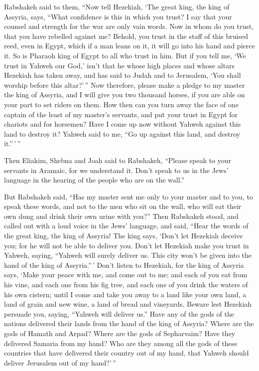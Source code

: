  Rabshakeh said to them, ``Now tell Hezekiah, `The great
king, the king of Assyria, says, ``What confidence is this in which you
trust?  I say that your counsel and strength for the war
are only vain words. Now in whom do you trust, that you have rebelled
against me?  Behold, you trust in the staff of this
bruised reed, even in Egypt, which if a man leans on it, it will go into
his hand and pierce it. So is Pharaoh king of Egypt to all who trust in
him.  But if you tell me, `We trust in Yahweh our God,'
isn't that he whose high places and whose altars Hezekiah has taken
away, and has said to Judah and to Jerusalem, `You shall worship before
this altar?'\,''  Now therefore, please make a pledge to
my master the king of Assyria, and I will give you two thousand horses,
if you are able on your part to set riders on them.  How
then can you turn away the face of one captain of the least of my
master's servants, and put your trust in Egypt for chariots and for
horsemen?  Have I come up now without Yahweh against this
land to destroy it? Yahweh said to me, ``Go up against this land, and
destroy it.''\,'\,''

 Then Eliakim, Shebna and Joah said to Rabshakeh,
``Please speak to your servants in Aramaic, for we understand it. Don't
speak to us in the Jews' language in the hearing of the people who are
on the wall.''

 But Rabshakeh said, ``Has my master sent me only to your
master and to you, to speak these words, and not to the men who sit on
the wall, who will eat their own dung and drink their own urine with
you?''  Then Rabshakeh stood, and called out with a loud
voice in the Jews' language, and said, ``Hear the words of the great
king, the king of Assyria!  The king says, `Don't let
Hezekiah deceive you; for he will not be able to deliver you.
 Don't let Hezekiah make you trust in Yahweh, saying,
``Yahweh will surely deliver us. This city won't be given into the hand
of the king of Assyria.''\,'  Don't listen to Hezekiah,
for the king of Assyria says, `Make your peace with me, and come out to
me; and each of you eat from his vine, and each one from his fig tree,
and each one of you drink the waters of his own cistern; 
until I come and take you away to a land like your own land, a land of
grain and new wine, a land of bread and vineyards. 
Beware lest Hezekiah persuade you, saying, ``Yahweh will deliver us.''
Have any of the gods of the nations delivered their lands from the hand
of the king of Assyria?  Where are the gods of Hamath and
Arpad? Where are the gods of Sepharvaim? Have they delivered Samaria
from my hand?  Who are they among all the gods of these
countries that have delivered their country out of my hand, that Yahweh
should deliver Jerusalem out of my hand?'\,''

